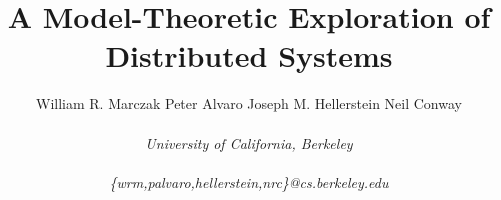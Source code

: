 \documentclass{sig-alternate}
\begin{document}
\title{A Model-Theoretic Exploration of Distributed Systems}
%


\author{
%
William R. Marczak \quad Peter Alvaro \quad Joseph M. Hellerstein \quad Neil Conway
\\\\
%
\fontsize{10}{10}\selectfont\itshape 
University of California, Berkeley\\\\ \fontsize{9}{9}\selectfont\ttfamily\upshape
%
\{wrm,palvaro,hellerstein,nrc\}@cs.berkeley.edu
%
}

\toappear{}

\maketitle
\end{document}
